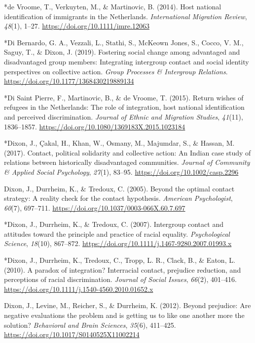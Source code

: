 \documentclass[12pt, letterpaper]{article}
\begin{document}
\leavevmode\hypertarget{ref-783}{}%
*de Vroome, T., Verkuyten, M., \& Martinovic, B. (2014). Host national
identification of immigrants in the Netherlands. \emph{International
Migration Review}, \emph{48}(1), 1--27.
\url{https://doi.org/10.1111/imre.12063}

\leavevmode\hypertarget{ref-3196}{}%
*Di Bernardo, G. A., Vezzali, L., Stathi, S., McKeown Jones, S., Cocco,
V. M., Saguy, T., \& Dixon, J. (2019). Fostering social change among
advantaged and disadvantaged group members: Integrating intergroup
contact and social identity perspectives on collective action.
\emph{Group Processes \& Intergroup Relations}.
\url{https://doi.org/10.1177/1368430219889134}

\leavevmode\hypertarget{ref-1807}{}%
*Di Saint Pierre, F., Martinovic, B., \& de Vroome, T. (2015). Return
wishes of refugees in the Netherlands: The role of integration, host
national identification and perceived discrimination. \emph{Journal of
Ethnic and Migration Studies}, \emph{41}(11), 1836--1857.
\url{https://doi.org/10.1080/1369183X.2015.1023184}

\leavevmode\hypertarget{ref-93}{}%
*Dixon, J., Çakal, H., Khan, W., Osmany, M., Majumdar, S., \& Hassan, M.
(2017). Contact, political solidarity and collective action: An Indian
case study of relations between historically disadvantaged communities.
\emph{Journal of Community \& Applied Social Psychology}, \emph{27}(1),
83--95. \url{https://doi.org/10.1002/casp.2296}

\leavevmode\hypertarget{ref-dixon_beyond_2005}{}%
Dixon, J., Durrheim, K., \& Tredoux, C. (2005). Beyond the optimal
contact strategy: A reality check for the contact hypothesis.
\emph{American Psychologist}, \emph{60}(7), 697--711.
\url{https://doi.org/10.1037/0003-066X.60.7.697}

\leavevmode\hypertarget{ref-1386}{}%
*Dixon, J., Durrheim, K., \& Tredoux, C. (2007). Intergroup contact and
attitudes toward the principle and practice of racial equality.
\emph{Psychological Science}, \emph{18}(10), 867--872.
\url{https://doi.org/10.1111/j.1467-9280.2007.01993.x}

\leavevmode\hypertarget{ref-336}{}%
*Dixon, J., Durrheim, K., Tredoux, C., Tropp, L. R., Clack, B., \&
Eaton, L. (2010). A paradox of integration? Interracial contact,
prejudice reduction, and perceptions of racial discrimination.
\emph{Journal of Social Issues}, \emph{66}(2), 401--416.
\url{https://doi.org/10.1111/j.1540-4560.2010.01652.x}

\leavevmode\hypertarget{ref-dixon_beyond_2012}{}%
Dixon, J., Levine, M., Reicher, S., \& Durrheim, K. (2012). Beyond
prejudice: Are negative evaluations the problem and is getting us to
like one another more the solution? \emph{Behavioral and Brain
Sciences}, \emph{35}(6), 411--425.
\url{https://doi.org/10.1017/S0140525X11002214}
\end{document}
